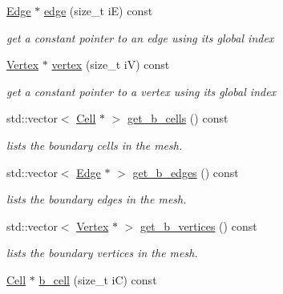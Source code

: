 \begin{DoxyCompactItemize}
\mbox{\label{classHArDCore2D_1_1Mesh_acad7cdf3d2c00fa6fc23ff77c63c7d1a}} 
\hyperlink{classHArDCore2D_1_1Edge}{Edge} $\ast$ \hyperlink{classHArDCore2D_1_1Mesh_acad7cdf3d2c00fa6fc23ff77c63c7d1a}{edge} (size\+\_\+t iE) const
\begin{DoxyCompactList}\small\item\em get a constant pointer to an edge using its global index \end{DoxyCompactList}\item 
\mbox{\label{classHArDCore2D_1_1Mesh_ad099224c697c05a57fad6a47fdcd9e76}} 
\hyperlink{classHArDCore2D_1_1Vertex}{Vertex} $\ast$ \hyperlink{classHArDCore2D_1_1Mesh_ad099224c697c05a57fad6a47fdcd9e76}{vertex} (size\+\_\+t iV) const
\begin{DoxyCompactList}\small\item\em get a constant pointer to a vertex using its global index \end{DoxyCompactList}\item 
std\+::vector$<$ \hyperlink{classHArDCore2D_1_1Cell}{Cell} $\ast$ $>$ \hyperlink{group__Mesh_gaf5cd4923da2e5abbe05c0f473e3b9c8f}{get\+\_\+b\+\_\+cells} () const
\begin{DoxyCompactList}\small\item\em lists the boundary cells in the mesh. \end{DoxyCompactList}\item 
std\+::vector$<$ \hyperlink{classHArDCore2D_1_1Edge}{Edge} $\ast$ $>$ \hyperlink{group__Mesh_gad876c80b23ab0c0d490b5dc8a60172b4}{get\+\_\+b\+\_\+edges} () const
\begin{DoxyCompactList}\small\item\em lists the boundary edges in the mesh. \end{DoxyCompactList}\item 
std\+::vector$<$ \hyperlink{classHArDCore2D_1_1Vertex}{Vertex} $\ast$ $>$ \hyperlink{group__Mesh_ga32dead5e72501d5001fd83aaa7379173}{get\+\_\+b\+\_\+vertices} () const
\begin{DoxyCompactList}\small\item\em lists the boundary vertices in the mesh. \end{DoxyCompactList}\item 
\mbox{\label{classHArDCore2D_1_1Mesh_a200361b60684c429e961e6b4f278dfb3}} 
\hyperlink{classHArDCore2D_1_1Cell}{Cell} $\ast$ \hyperlink{classHArDCore2D_1_1Mesh_a200361b60684c429e961e6b4f278dfb3}{b\+\_\+cell} (size\+\_\+t iC) const

\end{DoxyCompactItemize}
